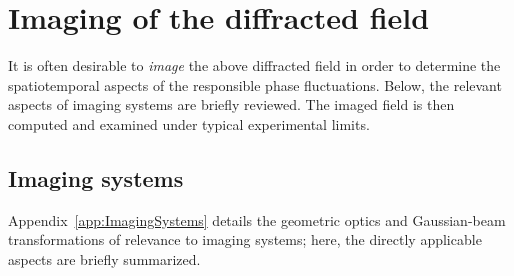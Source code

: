\section{Imaging of the diffracted field}
\label{sec:InterferometricMethods:imaging}
It is often desirable to \emph{image} the above diffracted field
in order to determine the spatiotemporal aspects
of the responsible phase fluctuations.
Below, the relevant aspects of imaging systems are briefly reviewed.
The imaged field is then computed and
examined under typical experimental limits.


\subsection{Imaging systems}
Appendix~\ref{app:ImagingSystems} details
the geometric optics and Gaussian-beam transformations
of relevance to imaging systems;
here, the directly applicable aspects
are briefly summarized.

